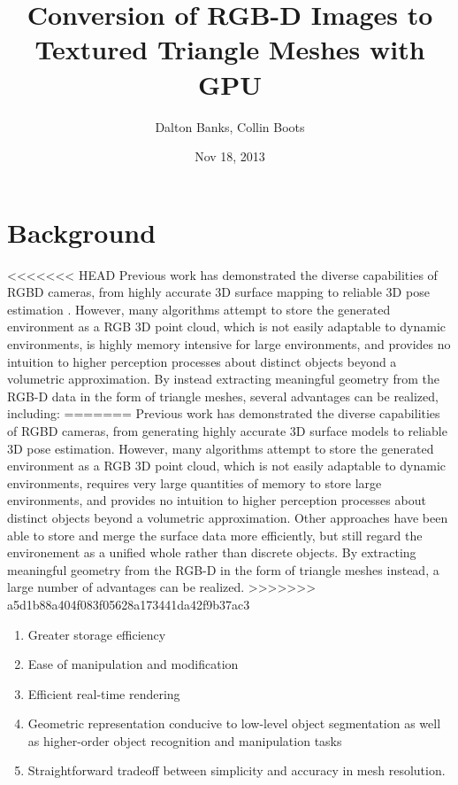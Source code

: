 \documentclass[letterpaper, 10 pt, conference]{ieeeconf}
\title{Conversion of RGB-D Images to Textured Triangle Meshes with GPU}
\author{Dalton Banks, Collin Boots}
\date{Nov 18, 2013}
\begin{document}
   \maketitle

\section{Background} 
<<<<<<< HEAD
Previous work has demonstrated the diverse capabilities of RGBD cameras, from highly accurate 3D surface mapping \cite{KinectFusion} to reliable 3D pose estimation \cite{Endres,Taguchi}. However, many algorithms attempt to store the generated environment as a RGB 3D point cloud, which is not easily adaptable to dynamic environments, is highly memory intensive for large environments, and provides no intuition to higher perception processes about distinct objects beyond a volumetric approximation. By instead extracting meaningful geometry from the RGB-D data in the form of triangle meshes, several advantages can be realized, including:
=======
Previous work has demonstrated the diverse capabilities of RGBD cameras, from generating highly accurate 3D surface models to reliable 3D pose estimation. However, many algorithms attempt to store the generated environment as a RGB 3D point cloud, which is not easily adaptable to dynamic environments, requires very large quantities of memory to store large environments, and provides no intuition to higher perception processes about distinct objects beyond a volumetric approximation. Other approaches have been able to store and merge the surface data more efficiently, but still regard the environement as a unified whole rather than discrete objects. By extracting meaningful geometry from the RGB-D in the form of triangle meshes instead, a large number of advantages can be realized.
>>>>>>> a5d1b88a404f083f05628a173441da42f9b37ac3

\begin{enumerate}
\item Greater storage efficiency
\item Ease of manipulation and modification
\item Efficient real-time rendering
\item Geometric representation conducive to low-level object segmentation as well as higher-order object recognition and manipulation tasks
\item Straightforward tradeoff between simplicity and accuracy in mesh resolution.
\end{enumerate}
\end{document}
